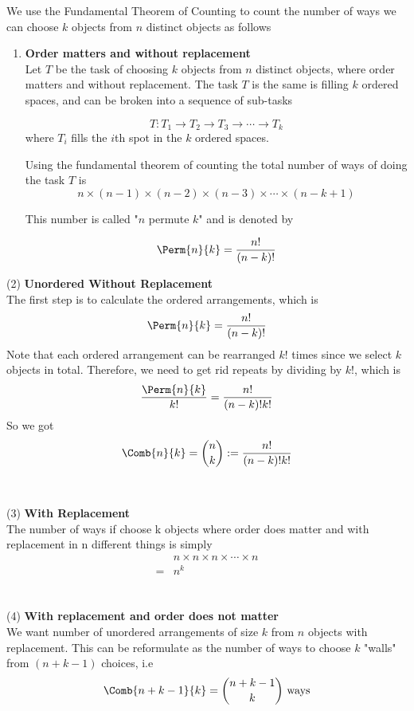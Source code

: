 We use the Fundamental Theorem of Counting to count the number of ways we can choose $k$ objects from $n$ distinct objects as follows\\

\begin{enumerate}
    \item \textbf{Order matters and without replacement}\\
    Let $T$ be the task of choosing $k$ objects from $n$ distinct objects, where order matters and without replacement.  The task $T$ is the same is filling $k$ ordered spaces, and can be broken into a sequence of sub-tasks
    
$$T:T_1\rightarrow T_2\rightarrow T_3 \rightarrow \cdots \rightarrow T_k$$
where $T_i$ fills the $i$th spot in the $k$ ordered spaces. 

Using the fundamental theorem of counting the total number of ways of doing the task $T$ is 
$$n\times (n-1)\times (n-2) \times (n-3) \times \cdots \times (n-k+1)$$

This number is called "$n$ permute $k$" and is denoted by

$$\Perm{n}{k}=\frac{n!}{(n-k)!}$$

\end{enumerate}

(2) \textbf{Unordered Without Replacement}\\
The first step is to calculate the ordered arrangements, which is \begin{align*}
\Perm{n}{k}=\frac{n!}{(n-k)!}
\end{align*}
Note that each ordered arrangement can be rearranged $k!$ times since we select $k$ objects in total. Therefore, we need to get rid repeats by dividing by $k!$, which is \begin{align*}
\frac{\Perm{n}{k}}{k!}=\frac{n!}{(n-k)!k!}
\end{align*}
So we got\begin{align*}
\Comb{n}{k}=\binom nk:=\frac{n!}{(n-k)!k!}
\end{align*}
\hfill\\
\hfill\\
(3) \textbf{With Replacement}\\
The number of ways if choose k objects where order does matter and with replacement in n different things is simply \begin{align*}
&n\times n \times n \times \cdots\times n \\
=&n^k
\end{align*}
\hfill\\
\hfill\\
(4) \textbf{ With replacement and order does not matter}\\
We want number of unordered arrangements of size $k$ from $n$ objects with replacement. This can be reformulate as the number of ways to choose $k$ "walls" from $(n+k-1)$ choices, i.e \begin{align*}
\Comb{n+k-1}{k}=\binom{n+k-1}{k} \text{ ways}
\end{align*} 


